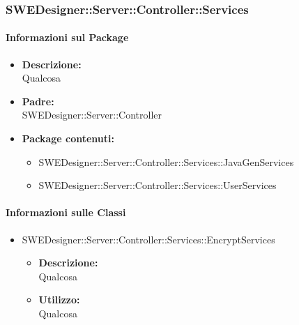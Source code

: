 	
		\subsubsection{SWEDesigner::Server::Controller::Services}
		\paragraph{Informazioni sul Package}
		\begin{itemize}				
			\item \textbf{Descrizione: }\\
			Qualcosa
			\item \textbf{Padre: }\\ SWEDesigner::Server::Controller
			\item \textbf{Package contenuti: }
			\begin{itemize}
				\item SWEDesigner::Server::Controller::Services::JavaGenServices
				\item SWEDesigner::Server::Controller::Services::UserServices
			\end{itemize}
		\end{itemize}
		\paragraph{Informazioni sulle Classi}
		\begin{itemize}
			\item SWEDesigner::Server::Controller::Services::EncryptServices
			\begin{itemize}
				\item \textbf{Descrizione: }\\
				Qualcosa
				\item \textbf{Utilizzo: }\\
				Qualcosa
			\end{itemize}
		\end{itemize}
		
